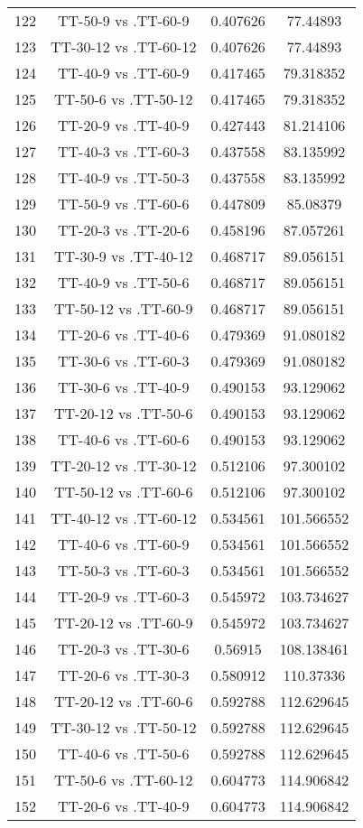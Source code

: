 \documentclass[a4paper,10pt]{article}
\begin{document}
\begin{landscape}
\begin{table}[!htp]
\begin{tabular}{cccc}
122&TT-50-9 vs .TT-60-9&0.407626&77.44893\\
123&TT-30-12 vs .TT-60-12&0.407626&77.44893\\
124&TT-40-9 vs .TT-60-9&0.417465&79.318352\\
125&TT-50-6 vs .TT-50-12&0.417465&79.318352\\
126&TT-20-9 vs .TT-40-9&0.427443&81.214106\\
127&TT-40-3 vs .TT-60-3&0.437558&83.135992\\
128&TT-40-9 vs .TT-50-3&0.437558&83.135992\\
129&TT-50-9 vs .TT-60-6&0.447809&85.08379\\
130&TT-20-3 vs .TT-20-6&0.458196&87.057261\\
131&TT-30-9 vs .TT-40-12&0.468717&89.056151\\
132&TT-40-9 vs .TT-50-6&0.468717&89.056151\\
133&TT-50-12 vs .TT-60-9&0.468717&89.056151\\
134&TT-20-6 vs .TT-40-6&0.479369&91.080182\\
135&TT-30-6 vs .TT-60-3&0.479369&91.080182\\
136&TT-30-6 vs .TT-40-9&0.490153&93.129062\\
137&TT-20-12 vs .TT-50-6&0.490153&93.129062\\
138&TT-40-6 vs .TT-60-6&0.490153&93.129062\\
139&TT-20-12 vs .TT-30-12&0.512106&97.300102\\
140&TT-50-12 vs .TT-60-6&0.512106&97.300102\\
141&TT-40-12 vs .TT-60-12&0.534561&101.566552\\
142&TT-40-6 vs .TT-60-9&0.534561&101.566552\\
143&TT-50-3 vs .TT-60-3&0.534561&101.566552\\
144&TT-20-9 vs .TT-60-3&0.545972&103.734627\\
145&TT-20-12 vs .TT-60-9&0.545972&103.734627\\
146&TT-20-3 vs .TT-30-6&0.56915&108.138461\\
147&TT-20-6 vs .TT-30-3&0.580912&110.37336\\
148&TT-20-12 vs .TT-60-6&0.592788&112.629645\\
149&TT-30-12 vs .TT-50-12&0.592788&112.629645\\
150&TT-40-6 vs .TT-50-6&0.592788&112.629645\\
151&TT-50-6 vs .TT-60-12&0.604773&114.906842\\
152&TT-20-6 vs .TT-40-9&0.604773&114.906842\\

\end{tabular}
\end{table}
\end{landscape}
\end{document}
